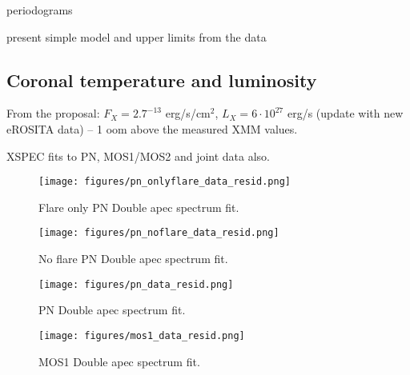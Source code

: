 \documentclass[twocolumn]{aastex631}
\begin{document}
periodograms

present simple model and upper limits from the data

\subsection{Coronal temperature and luminosity}

From the proposal: $F_X=2.7^{-13}$ erg/s/cm$^2$, $L_X=6\cdot10^27$ erg/s (update with new eROSITA data) -- 1 oom above the measured XMM values.
\begin{table*}
\footnotesize
    \caption{XSPEC fits to PN, MOS1/MOS2 and joint data also.}
    
        \label{tab:specfit}
\end{table*}

\begin{figure}
    \begin{centering}
        \texttt{[image: figures/pn\_onlyflare\_data\_resid.png]}
        \caption{
         Flare only PN Double apec spectrum fit.
        }
        \label{fig:spec_pn_onlyflare}
    \end{centering}
\end{figure}

\begin{figure}
    \begin{centering}
        \texttt{[image: figures/pn\_noflare\_data\_resid.png]}
        \caption{
         No flare PN Double apec spectrum fit.
        }
        \label{fig:spec_pn_noflare}
    \end{centering}
\end{figure}

\begin{figure}
    \begin{centering}
        \texttt{[image: figures/pn\_data\_resid.png]}
        \caption{
         PN Double apec spectrum fit.
        }
        \label{fig:spec_pn}
    \end{centering}
\end{figure}

\begin{figure}
    \begin{centering}
        \texttt{[image: figures/mos1\_data\_resid.png]}
        \caption{
         MOS1 Double apec spectrum fit.
        }
        \label{fig:spec_mos1}
    \end{centering}
\end{figure}
\end{document}
